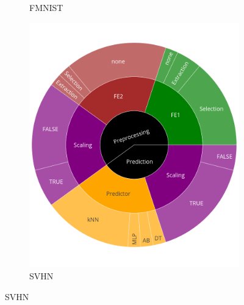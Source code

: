 \begin{figure}
\begin{subfigure}[t]{0.3\textwidth}
    \caption{FMNIST}
  	\end{subfigure}
	\begin{subfigure}[t]{0.3\textwidth}
    \centering\includegraphics[width=\textwidth]{img/sunburst/svhn.png}
    \caption{SVHN}
  	\end{subfigure}


\end{figure}
